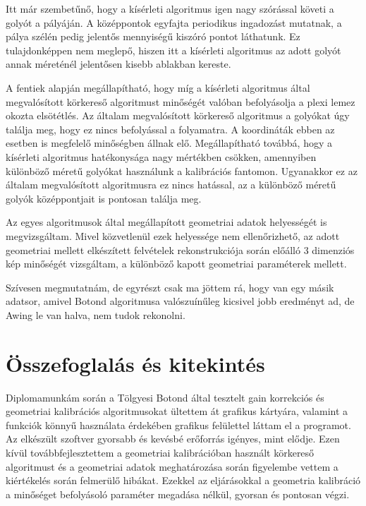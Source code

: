 \documentclass[a4paper,12pt]{article}
\begin{document}
Itt már szembetűnő, hogy a kísérleti algoritmus igen nagy szórással követi a  golyót a pályáján. A középpontok egyfajta periodikus ingadozást mutatnak, a pálya szélén pedig jelentős mennyiségű kiszóró pontot láthatunk. Ez tulajdonképpen nem meglepő, hiszen itt a kísérleti algoritmus az adott golyót annak méreténél jelentősen kisebb ablakban kereste. 


A fentiek alapján megállapítható, hogy míg a kísérleti algoritmus által megvalósított körkereső algoritmust minőségét valóban befolyásolja a plexi lemez okozta elsötétlés. Az általam megvalósított körkereső algoritmus a golyókat úgy találja meg, hogy ez nincs befolyással a folyamatra. A koordináták ebben az esetben is megfelelő minőségben állnak elő. Megállapítható továbbá, hogy a kísérleti algoritmus hatékonysága nagy mértékben csökken, amennyiben különböző méretű golyókat használunk a kalibrációs fantomon. Ugyanakkor ez az általam megvalósított algoritmusra ez nincs hatással, az a különböző méretű golyók középpontjait is pontosan találja meg.



Az egyes algoritmusok által megállapított geometriai adatok helyességét is megvizsgáltam. Mivel közvetlenül ezek helyessége nem ellenőrizhető, az adott geometriai mellett elkészített felvételek rekonstrukciója során előálló 3 dimenziós kép minőségét vizsgáltam, a különböző kapott geometriai paraméterek mellett. 


{ \Huge Szívesen megmutatnám, de egyrészt csak ma jöttem rá, hogy van egy másik adatsor, amivel Botond algoritmusa valószuínűleg kicsivel jobb eredményt ad, de Awing le van halva, nem tudok rekonolni.}


\section{Összefoglalás és kitekintés}


Diplomamunkám során a Tölgyesi Botond által \cite{botond} tesztelt gain korrekciós és geometriai kalibrációs algoritmusokat ültettem át grafikus kártyára, valamint a funkciók könnyű használata érdekében grafikus felülettel láttam el a programot. Az elkészült szoftver gyorsabb és kevésbé erőforrás igényes, mint elődje. Ezen kívül továbbfejlesztettem a geometriai kalibrációban használt körkereső algoritmust és a geometriai adatok meghatározása során figyelembe vettem a kiértékelés során felmerülő hibákat. Ezekkel az eljárásokkal a geometria kalibráció a minőséget befolyásoló paraméter megadása nélkül, gyorsan és pontosan végzi. 
\end{document}
